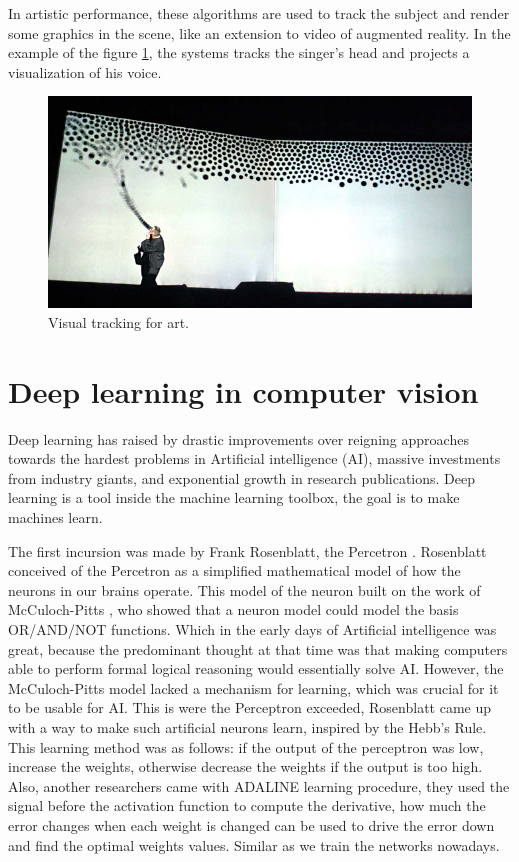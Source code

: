 In artistic performance, these algorithms are used to track the subject and render some graphics in the scene, like an extension to video of augmented reality. In the example of the figure \ref{introTracking4}, the systems tracks the singer's head and projects a visualization of his voice.

\begin{figure}[H]
\centering         
\includegraphics[width=12cm]{aplicaciones/singing.jpg}
\caption{Visual tracking for art.} \label{introTracking4}
\end{figure}


\section{Deep learning in computer vision}

Deep learning has raised by drastic improvements over reigning approaches towards the hardest problems in Artificial intelligence (AI), massive investments from industry giants, and exponential growth in research publications. Deep learning is a tool inside the machine learning toolbox, the goal is to make machines learn.

The first incursion was made by Frank Rosenblatt, the Percetron \cite{rosenblat}. Rosenblatt conceived of the Percetron as a simplified mathematical model of how the neurons in our brains operate. This model of the neuron built on the work of McCuloch-Pitts \cite{McCulloch}, who showed that a neuron model could model the basis OR/AND/NOT functions. Which in the early days of Artificial intelligence was great, because the predominant thought at that time was that making computers able to perform formal logical reasoning would essentially solve AI. However, the McCuloch-Pitts model lacked a mechanism for learning, which was crucial for it to be usable for AI. This is were the Perceptron exceeded, Rosenblatt came up with a way to make such artificial neurons learn, inspired by the Hebb's Rule. This learning method was as follows: if the output of the perceptron was low, increase the weights, otherwise decrease the weights if the output is too high. Also, another researchers came with ADALINE \cite{adaline} learning procedure, they used the signal before the activation function to compute the derivative, how much the error changes when each weight is changed can be used to drive the error down and find the optimal weights values. Similar as we train the networks nowadays.

